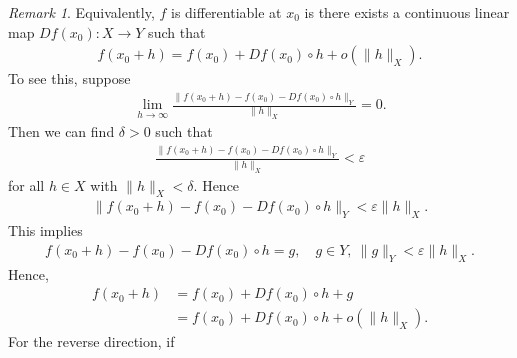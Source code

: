 \documentclass[12pt,reqno]{amsart}
\numberwithin{equation}{section}  %
\numberwithin{figure}{section}
\newcommand{\ee}{\varepsilon}
\theoremstyle{plain}
\theoremstyle{definition}
\theoremstyle{remark}
\newtheorem{remark}{Remark}
\begin{document}
  \begin{framed}
  \begin{remark}
    Equivalently, $f$ is differentiable at $x_{0}$ is there exists a continuous
    linear map $Df(x_{0}): X \to Y$ such that
    \begin{equation*}
    \begin{split}
      f(x_{0} + h) = f(x_{0}) + Df(x_{0}) \circ h + o(\| h \|_{X}).
    \end{split}
    \end{equation*}
    To see this, suppose
    \begin{equation*}
    \begin{split}
      \lim_{h \to \infty} \frac{\| f(x_{0} + h) - f(x_{0}) - Df(x_{0}) \circ h
      \|_{Y}}{\| h \|_{X}} = 0.
    \end{split}
    \end{equation*}
    Then we can find $\delta > 0$ such that
    \begin{equation*}
    \begin{split}
    \frac{\| f(x_{0} + h) - f(x_{0}) - Df(x_{0}) \circ h
      \|_{Y}}{\| h \|_{X}}  < \ee
    \end{split}
    \end{equation*}
    for all $h \in X$ with $\| h \|_{X} < \delta$. Hence
    \begin{equation*}
    \begin{split}
      \| f(x_{0} + h) - f(x_{0}) - Df(x_{0}) \circ h \|_{Y} < \ee \| h
      \|_{X}.
    \end{split}
    \end{equation*}
    This implies
    \begin{equation*}
    \begin{split}
      f(x_{0} + h) - f(x_{0}) - Df(x_{0}) \circ h = g, \quad g \in Y, \ \| g
      \|_{Y} < \ee \| h \|_{X}.
    \end{split}
    \end{equation*}
    Hence, 
    \begin{equation*}
    \begin{split}
      f(x_{0} + h) 
      & = f(x_{0}) + Df(x_{0}) \circ h + g
      \\
      & =  f(x_{0}) + Df(x_{0})\circ h + o(\| h \|_{X}).
    \end{split}
    \end{equation*}
    For the reverse direction, if

\end{remark}
\end{framed}
\end{document}
